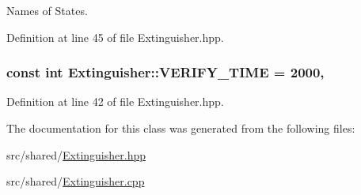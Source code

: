 Names of States. 



Definition at line 45 of file Extinguisher.\-hpp.

\hypertarget{classExtinguisher_a1f4f2c248d5fcf98a62eab8019ab79f9}{
\subsubsection[{V\-E\-R\-I\-F\-Y\-\_\-\-T\-I\-M\-E}]{\setlength{\rightskip}{0pt plus 5cm}const int Extinguisher\-::\-V\-E\-R\-I\-F\-Y\-\_\-\-T\-I\-M\-E = 2000\hspace{0.3cm}{\ttfamily [static]}, {\ttfamily [private]}}}\label{classExtinguisher_a1f4f2c248d5fcf98a62eab8019ab79f9}


Definition at line 42 of file Extinguisher.\-hpp.



The documentation for this class was generated from the following files\-:\begin{DoxyCompactItemize}
\item 
src/shared/\hyperlink{Extinguisher_8hpp}{Extinguisher.\-hpp}\item 
src/shared/\hyperlink{Extinguisher_8cpp}{Extinguisher.\-cpp}\end{DoxyCompactItemize}
